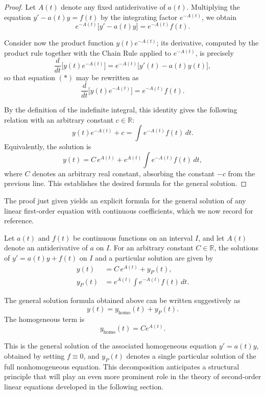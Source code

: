 \begin{proof}
Let $A(t)$ denote any fixed antiderivative of $a(t)$. Multiplying the equation $y' - a(t) y = f(t)$ by the integrating factor $e^{-A(t)}$, we obtain
\begin{equation*}
e^{-A(t)} \big[ y' - a(t) y \big] = e^{-A(t)} f(t). \tag{$*$}
\end{equation*}

Consider now the product function $y(t) e^{-A(t)}$; its derivative, computed by the product rule together with the Chain Rule applied to $e^{-A(t)}$, is precisely
\[
\frac{d}{dt} \big[ y(t) e^{-A(t)} \big] = e^{-A(t)} \big[ y'(t) - a(t) y(t) \big],
\] so that equation $(*)$ may be rewritten as
\[
\frac{d}{dt} \big[ y(t) e^{-A(t)} \big] = e^{-A(t)} f(t).
\]

By the definition of the indefinite integral, this identity gives the following relation with an arbitrary constant $c \in \mathbb{R}$:
\[
y(t) e^{-A(t)} + c = \int e^{-A(t)} f(t) \, dt.
\]
Equivalently, the solution is \[
y(t) = C \, e^{A(t)} + e^{A(t)} \int e^{-A(t)} f(t) \, dt,
\] where $C$ denotes an arbitrary real constant, absorbing the constant $-c$ from the previous line. This establishes the desired formula for the general solution.
\end{proof}

The proof just given yields an explicit formula for the general solution of any linear first-order equation with continuous coefficients, which we now record for reference.

\begin{theorem}
Let $a(t)$ and $f(t)$ be continuous functions on an interval $I$, and let $A(t)$ denote an antiderivative of $a$ on $I$. For an arbitrary constant $C \in \mathbb{R}$, the solutions of $y' = a(t) y + f(t)$ on $I$ and a particular solution are given by
\[
\begin{aligned}
y(t) &= C \, e^{A(t)} + y_P(t), \\
y_P(t) &= e^{A(t)} \int e^{-A(t)} f(t) \, dt.
\end{aligned}
\]

\end{theorem}

\begin{remark}
The general solution formula obtained above can be written suggestively as
\[
y(t) = y_{\text{homo}}(t) + y_P(t).
\]
The homogeneous term is
\[
y_{\text{homo}}(t) = C e^{A(t)}.
\]

This is the general solution of the associated homogeneous equation $y' = a(t) y$, obtained by setting $f \equiv 0$, and $y_P(t)$ denotes a single particular solution of the full nonhomogeneous equation. This decomposition anticipates a structural principle that will play an even more prominent role in the theory of second-order linear equations developed in the following section.
\end{remark}

